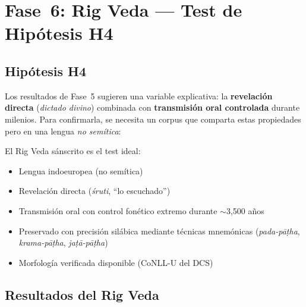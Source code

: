 \documentclass[12pt,a4paper]{article}
\begin{document}
\section{Fase~6: Rig Veda --- Test de Hip\'otesis H4}

\subsection{Hip\'otesis H4}

Los resultados de Fase~5 sugieren una variable explicativa: la \textbf{revelaci\'on
directa} (\emph{dictado divino}) combinada con \textbf{transmisi\'on oral controlada}
durante milenios. Para confirmarla, se necesita un corpus que comparta estas propiedades
pero en una lengua \emph{no sem\'itica}:

\begin{center}
\end{center}

\noindent
El Rig Veda s\'anscrito es el test ideal:
\begin{itemize}[leftmargin=2em]
\item Lengua indoeuropea (no sem\'itica)
\item Revelaci\'on directa (\emph{\'{s}ruti}, ``lo escuchado'')
\item Transmisi\'on oral con control fon\'etico extremo durante $\sim$3,500 a\~nos
\item Preservado con precisi\'on sil\'abica mediante t\'ecnicas mnem\'onicas
      (\emph{pada-p\=a\d{t}ha}, \emph{krama-p\=a\d{t}ha}, \emph{ja\d{t}\=a-p\=a\d{t}ha})
\item Morfolog\'ia verificada disponible (CoNLL-U del DCS)
\end{itemize}

\subsection{Resultados del Rig Veda}
\end{document}
